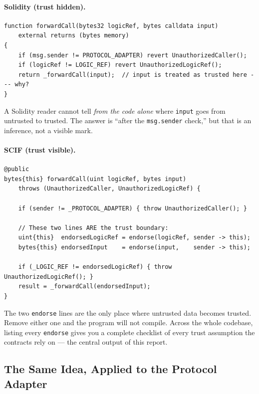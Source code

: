 \documentclass[11pt,a4paper]{article}
\begin{document}
\paragraph{Solidity (trust hidden).}

\begin{lstlisting}[style=soliditystyle,caption={\texttt{ForwarderBase.forwardCall} --- where does trust change?}]
function forwardCall(bytes32 logicRef, bytes calldata input)
    external returns (bytes memory)
{
    if (msg.sender != PROTOCOL_ADAPTER) revert UnauthorizedCaller();
    if (logicRef != LOGIC_REF) revert UnauthorizedLogicRef();
    return _forwardCall(input);  // input is treated as trusted here --- why?
}
\end{lstlisting}

A Solidity reader cannot tell \emph{from the code alone} where \texttt{input}
goes from untrusted to trusted. The answer is ``after the
\texttt{msg.sender} check,'' but that is an inference, not a visible mark.

\paragraph{SCIF (trust visible).}

\begin{lstlisting}[style=scifstyle,caption={Same function in SCIF --- every trust promotion is named.}]
@public
bytes{this} forwardCall(uint logicRef, bytes input)
    throws (UnauthorizedCaller, UnauthorizedLogicRef) {

    if (sender != _PROTOCOL_ADAPTER) { throw UnauthorizedCaller(); }

    // These two lines ARE the trust boundary:
    uint{this}  endorsedLogicRef = endorse(logicRef, sender -> this);
    bytes{this} endorsedInput    = endorse(input,    sender -> this);

    if (_LOGIC_REF != endorsedLogicRef) { throw UnauthorizedLogicRef(); }
    result = _forwardCall(endorsedInput);
}
\end{lstlisting}

The two \texttt{endorse} lines are the only place where untrusted data
becomes trusted. Remove either one and the program will not compile.
Across the whole codebase, listing every \texttt{endorse} gives you a
complete checklist of every trust assumption the contracts rely on ---
the central output of this report.

\subsection{The Same Idea, Applied to the Protocol Adapter}
\label{sec:primer-pa}
\end{document}
